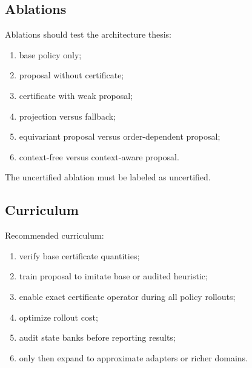 \documentclass[a4paper,11pt]{article}
\theoremstyle{definition}
\begin{document}
\subsection{Ablations}

Ablations should test the architecture thesis:
\begin{enumerate}
  \item base policy only;
  \item proposal without certificate;
  \item certificate with weak proposal;
  \item projection versus fallback;
  \item equivariant proposal versus order-dependent proposal;
  \item context-free versus context-aware proposal.
\end{enumerate}
The uncertified ablation must be labeled as uncertified.

\subsection{Curriculum}

Recommended curriculum:
\begin{enumerate}
  \item verify base certificate quantities;
  \item train proposal to imitate base or audited heuristic;
  \item enable exact certificate operator during all policy rollouts;
  \item optimize rollout cost;
  \item audit state banks before reporting results;
  \item only then expand to approximate adapters or richer domains.
\end{enumerate}
\end{document}
